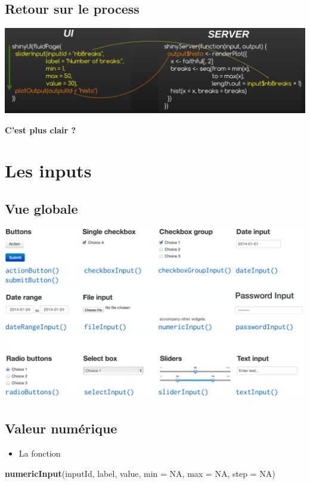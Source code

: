 \documentclass[]{article}
\newenvironment{Shaded}{\begin{snugshade}}{\end{snugshade}}
\newcommand{\KeywordTok}[1]{\textcolor[rgb]{0.13,0.29,0.53}{\textbf{#1}}}
\newcommand{\DataTypeTok}[1]{\textcolor[rgb]{0.13,0.29,0.53}{#1}}
\newcommand{\OtherTok}[1]{\textcolor[rgb]{0.56,0.35,0.01}{#1}}
\newcommand{\NormalTok}[1]{#1}
\providecommand{\tightlist}{%
  \setlength{\itemsep}{0pt}\setlength{\parskip}{0pt}}
\begin{document}
\subsection{Retour sur le process}\label{retour-sur-le-process}

\includegraphics{img/shiny_process.png}

\textbf{C'est plus clair ?}

\section{Les inputs}\label{les-inputs}

\subsection{Vue globale}\label{vue-globale}

\includegraphics{img/all_input.png}

\subsection{Valeur numérique}\label{valeur-numerique}

\begin{itemize}
\tightlist
\item
  La fonction
\end{itemize}

\begin{Shaded}
\begin{Highlighting}[]
\KeywordTok{numericInput}\NormalTok{(inputId, label, value, }\DataTypeTok{min =} \OtherTok{NA}\NormalTok{, }\DataTypeTok{max =} \OtherTok{NA}\NormalTok{, }\DataTypeTok{step =} \OtherTok{NA}\NormalTok{)}
\end{Highlighting}
\end{Shaded}
\end{document}
